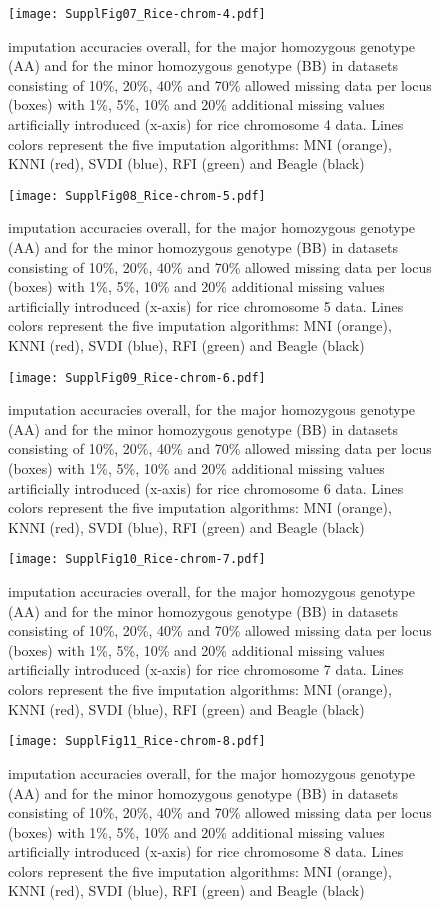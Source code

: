 \begin{figure}\texttt{[image: SupplFig07\_Rice-chrom-4.pdf]}\caption{
imputation accuracies overall, for the major homozygous genotype (AA) and for the minor homozygous genotype (BB) in datasets consisting of
10\%, 20\%, 40\% and 70\% allowed missing data per locus (boxes) with 1\%, 5\%, 10\% and 20\%
additional missing values artificially introduced (x-axis) for rice chromosome 4 data.
Lines colors represent the five imputation algorithms: MNI
(orange), KNNI (red), SVDI (blue), RFI (green) and Beagle (black)}\end{figure}
\begin{figure}\texttt{[image: SupplFig08\_Rice-chrom-5.pdf]}\caption{
imputation accuracies overall, for the major homozygous genotype (AA) and for the minor homozygous genotype (BB) in datasets consisting of
10\%, 20\%, 40\% and 70\% allowed missing data per locus (boxes) with 1\%, 5\%, 10\% and 20\%
additional missing values artificially introduced (x-axis) for rice chromosome 5 data.
Lines colors represent the five imputation algorithms: MNI
(orange), KNNI (red), SVDI (blue), RFI (green) and Beagle (black)}\end{figure}
\begin{figure}\texttt{[image: SupplFig09\_Rice-chrom-6.pdf]}\caption{
imputation accuracies overall, for the major homozygous genotype (AA) and for the minor homozygous genotype (BB) in datasets consisting of
10\%, 20\%, 40\% and 70\% allowed missing data per locus (boxes) with 1\%, 5\%, 10\% and 20\%
additional missing values artificially introduced (x-axis) for rice chromosome 6 data.
Lines colors represent the five imputation algorithms: MNI
(orange), KNNI (red), SVDI (blue), RFI (green) and Beagle (black)}\end{figure}
\begin{figure}\texttt{[image: SupplFig10\_Rice-chrom-7.pdf]}\caption{
imputation accuracies overall, for the major homozygous genotype (AA) and for the minor homozygous genotype (BB) in datasets consisting of
10\%, 20\%, 40\% and 70\% allowed missing data per locus (boxes) with 1\%, 5\%, 10\% and 20\%
additional missing values artificially introduced (x-axis) for rice chromosome 7 data.
Lines colors represent the five imputation algorithms: MNI
(orange), KNNI (red), SVDI (blue), RFI (green) and Beagle (black)}\end{figure}
\begin{figure}\texttt{[image: SupplFig11\_Rice-chrom-8.pdf]}\caption{
imputation accuracies overall, for the major homozygous genotype (AA) and for the minor homozygous genotype (BB) in datasets consisting of
10\%, 20\%, 40\% and 70\% allowed missing data per locus (boxes) with 1\%, 5\%, 10\% and 20\%
additional missing values artificially introduced (x-axis) for rice chromosome 8 data.
Lines colors represent the five imputation algorithms: MNI
(orange), KNNI (red), SVDI (blue), RFI (green) and Beagle (black)}\end{figure}
